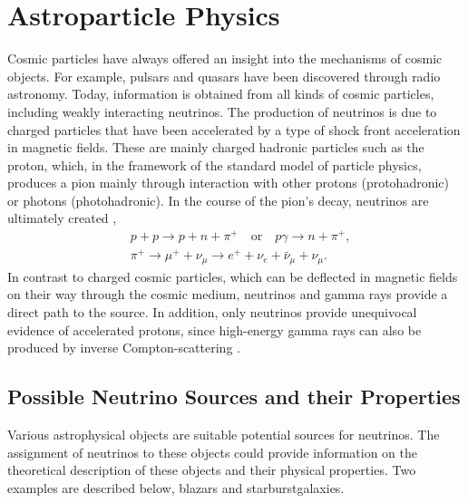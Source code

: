 \chapter{Astroparticle Physics} \label{sec:astro}

Cosmic particles have always offered an insight into the mechanisms of cosmic objects.
For example, pulsars and quasars have been discovered through radio astronomy.
Today, information is obtained from all kinds of cosmic particles, including weakly interacting neutrinos.
The production of neutrinos is due to charged particles that have been accelerated by a type of shock front acceleration in magnetic fields.
These are mainly charged hadronic particles such as the proton, which, in the framework of the standard model of particle physics, produces a pion mainly through interaction with other protons (protohadronic) or photons (photohadronic).
In the course of the pion's decay, neutrinos are ultimately created \cite{pdg},
\begin{align}
  &p+p \rightarrow p+n+\pi^+ \quad \text{or} \quad p\gamma \rightarrow n+\pi^+,\\
  &\pi^+ \rightarrow \mu^++\nu_\mu \rightarrow e^++\nu_e+\bar{\nu}_\mu+\nu_\mu.
\end{align}
In contrast to charged cosmic particles, which can be deflected in magnetic fields on their way through the cosmic medium, neutrinos and gamma rays provide a direct path to the source.
In addition, only neutrinos provide unequivocal evidence of accelerated protons, since high-energy gamma rays can also be produced by inverse Compton-scattering \cite{spiering}.


\section{Possible Neutrino Sources and their Properties}

Various astrophysical objects are suitable potential sources for neutrinos.
The assignment of neutrinos to these objects could provide information on the theoretical description of these objects and their physical properties.
Two examples are described below, blazars and starburstgalaxies.

